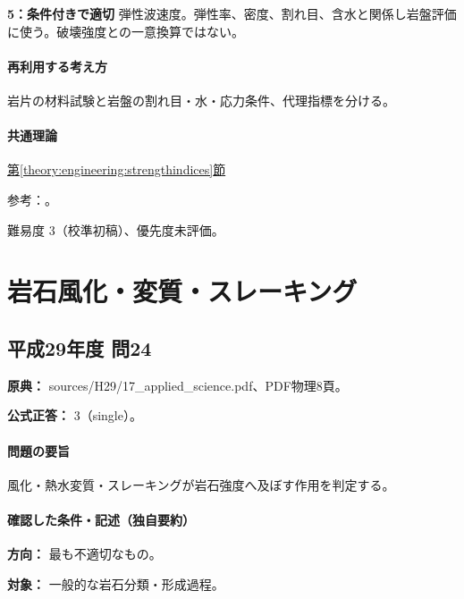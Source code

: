\noindent\textbf{5：条件付きで適切} 弾性波速度。弾性率、密度、割れ目、含水と関係し岩盤評価に使う。破壊強度との一意換算ではない。\par

\paragraph{再利用する考え方} 岩片の材料試験と岩盤の割れ目・水・応力条件、代理指標を分ける。

\paragraph{共通理論} \hyperref[theory:engineering:strengthindices]{第\ref*{theory:engineering:strengthindices}節}

\par 参考：\cite{jseg_engineering_faq,geebec_ps}。

\par 難易度 3（校準初稿）、優先度未評価。

\section{岩石風化・変質・スレーキング}

\subsection{平成29年度 問24}
\label{q:h29-reg-applied-24}

\noindent\textbf{原典：} sources/H29/17\_applied\_science.pdf、PDF物理8頁。

\textbf{公式正答：} 3（single）。

\paragraph{問題の要旨} 風化・熱水変質・スレーキングが岩石強度へ及ぼす作用を判定する。

\paragraph{確認した条件・記述（独自要約）}\mbox{}\par

\noindent\textbf{方向：} 最も不適切なもの。\par

\noindent\textbf{対象：} 一般的な岩石分類・形成過程。\par

